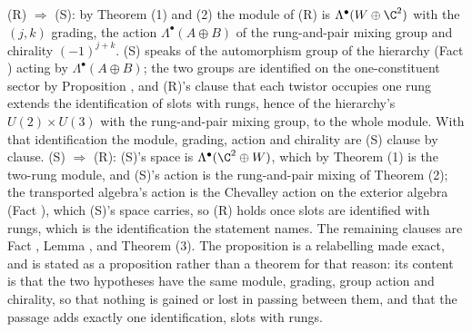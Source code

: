 (R) $\Rightarrow$ (S): by Theorem (1) and (2) the module of (R) is $\Lambda^{\bullet}(W \oplus \C^{2})$ with the $(j,k)$ grading, the action $\Lambda^{\bullet}(A \oplus B)$ of the rung-and-pair mixing group and chirality $(-1)^{j+k}$. (S) speaks of the automorphism group of the hierarchy (Fact ) acting by $\Lambda^{\bullet}(A \oplus B)$; the two groups are identified on the one-constituent sector by Proposition , and (R)'s clause that each twistor occupies one rung extends the identification of slots with rungs, hence of the hierarchy's $U(2) \times U(3)$ with the rung-and-pair mixing group, to the whole module. With that identification the module, grading, action and chirality are (S) clause by clause. (S) $\Rightarrow$ (R): (S)'s space is $\Lambda^{\bullet}(\C^{2} \oplus W)$, which by Theorem (1) is the two-rung module, and (S)'s action is the rung-and-pair mixing of Theorem (2); the transported algebra's action is the Chevalley action on the exterior algebra (Fact ), which (S)'s space carries, so (R) holds once slots are identified with rungs, which is the identification the statement names. The remaining clauses are Fact , Lemma , and Theorem (3). The proposition is a relabelling made exact, and is stated as a proposition rather than a theorem for that reason: its content is that the two hypotheses have the same module, grading, group action and chirality, so that nothing is gained or lost in passing between them, and that the passage adds exactly one identification, slots with rungs.

